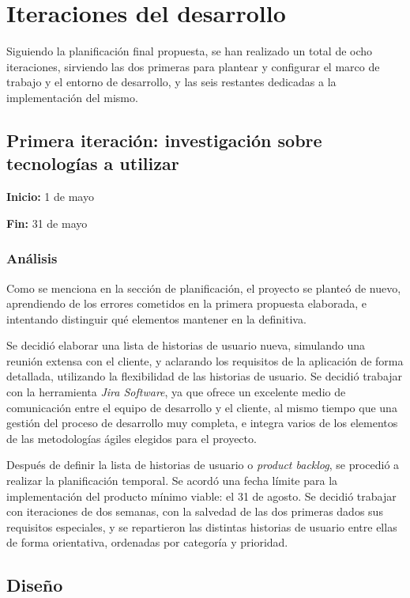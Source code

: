 \documentclass[10pt, a4paper]{aqademic}
\begin{document}
\newpage

\section{Iteraciones del desarrollo}

Siguiendo la planificación final propuesta, se han realizado un total de ocho iteraciones, sirviendo las dos primeras para plantear y configurar el marco de trabajo y el entorno de desarrollo, y las seis restantes dedicadas a la implementación del mismo.


\subsection{Primera iteración: investigación sobre tecnologías a utilizar}

\textbf{Inicio:} 1 de mayo

\textbf{Fin:} 31 de mayo

\subsubsection{Análisis}

Como se menciona en la sección de planificación, el proyecto se planteó de nuevo, aprendiendo de los errores cometidos en la primera propuesta elaborada, e intentando distinguir qué elementos mantener en la definitiva.

Se decidió elaborar una lista de historias de usuario nueva, simulando una reunión extensa con el cliente, y aclarando los requisitos de la aplicación de forma detallada, utilizando la flexibilidad de las historias de usuario. Se decidió trabajar con la herramienta \textit{Jira Software}, ya que ofrece un excelente medio de comunicación entre el equipo de desarrollo y el cliente, al mismo tiempo que una gestión del proceso de desarrollo muy completa, e integra varios de los elementos de las metodologías ágiles elegidos para el proyecto.

Después de definir la lista de historias de usuario o \textit{product backlog}, se procedió a realizar la planificación temporal. Se acordó una fecha límite para la implementación del producto mínimo viable: el 31 de agosto. Se decidió trabajar con iteraciones de dos semanas, con la salvedad de las dos primeras dados sus requisitos especiales, y se repartieron las distintas historias de usuario entre ellas de forma orientativa, ordenadas por categoría y prioridad.


\subsection{Diseño}
\end{document}
